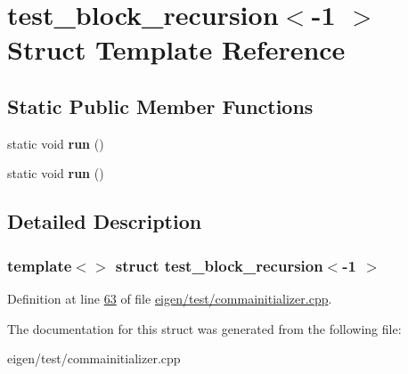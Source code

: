 \hypertarget{structtest__block__recursion_3-1_01_4}{}\section{test\+\_\+block\+\_\+recursion$<$-\/1 $>$ Struct Template Reference}
\label{structtest__block__recursion_3-1_01_4}
\subsection*{Static Public Member Functions}
\begin{DoxyCompactItemize}
\item 
\mbox{\label{structtest__block__recursion_3-1_01_4_ae36be4fc09d5cd99f86153a6e992479d}} 
static void {\bfseries run} ()
\item 
\mbox{\label{structtest__block__recursion_3-1_01_4_ae36be4fc09d5cd99f86153a6e992479d}} 
static void {\bfseries run} ()
\end{DoxyCompactItemize}


\subsection{Detailed Description}
\subsubsection*{template$<$$>$\newline
struct test\+\_\+block\+\_\+recursion$<$-\/1 $>$}



Definition at line \hyperlink{eigen_2test_2commainitializer_8cpp_source_l00063}{63} of file \hyperlink{eigen_2test_2commainitializer_8cpp_source}{eigen/test/commainitializer.\+cpp}.



The documentation for this struct was generated from the following file\+:\begin{DoxyCompactItemize}
\item 
eigen/test/commainitializer.\+cpp\end{DoxyCompactItemize}
